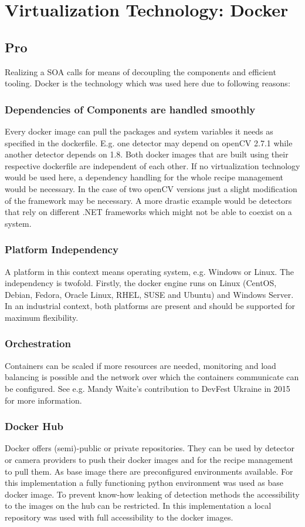 \section{Virtualization Technology: Docker}
\subsection{Pro}
Realizing a SOA calls for means of decoupling the components and efficient tooling. Docker is the technology which was used here due to following reasons:
\subsubsection{Dependencies of Components are handled smoothly} 
Every docker image can pull the packages and system variables it needs as specified in the dockerfile. E.g. one detector may depend on openCV 2.7.1 while another detector depends on 1.8. Both docker images that are built using their respective dockerfile are independent of each other. If no virtualization technology would be used here, a dependency handling for the whole recipe management would be necessary. In the case of two openCV versions just a slight modification of the framework may be necessary. A more drastic example would be detectors that rely on different .NET frameworks which might not be able to coexist on a system.
\subsubsection{Platform Independency}
 A platform in this context means operating system, e.g. Windows or Linux. The independency is twofold. Firstly, the docker engine runs on Linux (CentOS, Debian, Fedora, Oracle Linux, RHEL, SUSE and Ubuntu) and Windows Server. In an industrial context, both platforms are present and should be supported for maximum flexibility.
\subsubsection{Orchestration}
 Containers can be scaled if more resources are needed, monitoring and load balancing is possible and the network over which the containers communicate can be configured. See e.g. Mandy Waite's contribution to DevFest Ukraine in 2015 for more information. \cite{Waite2015ScalableContainers}
\subsubsection{Docker Hub}
 Docker offers (semi)-public or private repositories. They can be used by detector or camera providers to push their docker images and for the recipe management to pull them. As base image there are preconfigured environments available. For this implementation a fully functioning python environment was used as base docker image. To prevent know-how leaking of detection methods the accessibility to the images on the hub can be restricted. In this implementation a local repository was used with full accessibility to the docker images.
